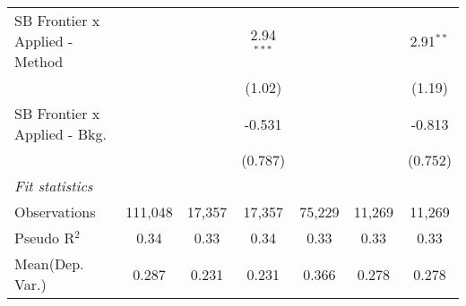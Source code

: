 \begin{tabular}{lcccccc}
   SB Frontier x Applied - Method &               &              & 2.94$^{***}$  &               &              & 2.91$^{**}$\\   
                                  &               &              & (1.02)        &               &              & (1.19)\\   
   SB Frontier x Applied - Bkg.   &               &              & -0.531        &               &              & -0.813\\   
                                  &               &              & (0.787)       &               &              & (0.752)\\   
   \midrule
   \emph{Fit statistics}\\
   Observations                   & 111,048       & 17,357       & 17,357        & 75,229        & 11,269       & 11,269\\  
   Pseudo R$^2$                   & 0.34          & 0.33         & 0.34          & 0.33          & 0.33         & 0.33\\  
Mean(Dep. Var.) & 0.287 & 0.231 & 0.231 & 0.366 & 0.278 & 0.278 \\
   

\end{tabular}

